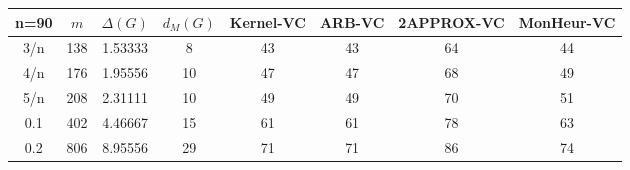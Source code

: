 \begin{tabular}{||c||ccc||cccc||}
 \hline \hline 
 n=90&$m$&$\Delta (G)$&$d_M(G)$& Kernel-VC & ARB-VC & 2APPROX-VC & MonHeur-VC\\ \hline \hline
3/n&138&1.53333&8&43&43&64&44\\
4/n&176&1.95556&10&47&47&68&49\\
5/n&208&2.31111&10&49&49&70&51\\
0.1&402&4.46667&15&61&61&78&63\\
0.2&806&8.95556&29&71&71&86&74\\
\hline \end{tabular}

